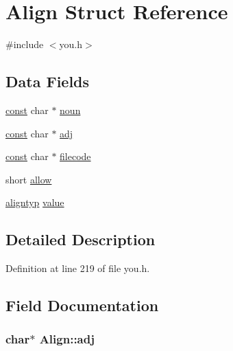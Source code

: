 \hypertarget{structAlign}{\section{Align Struct Reference}
\label{structAlign}
}


{\ttfamily \#include $<$you.\+h$>$}

\subsection*{Data Fields}
\begin{DoxyCompactItemize}
\item 
\hyperlink{tradstdc_8h_a2c212835823e3c54a8ab6d95c652660e}{const} char $\ast$ \hyperlink{structAlign_a94d7781f2c6519d3a4f61e739ce8bedc}{noun}
\item 
\hyperlink{tradstdc_8h_a2c212835823e3c54a8ab6d95c652660e}{const} char $\ast$ \hyperlink{structAlign_acfb054507e2d5b8e2c368deb54df56bd}{adj}
\item 
\hyperlink{tradstdc_8h_a2c212835823e3c54a8ab6d95c652660e}{const} char $\ast$ \hyperlink{structAlign_aea4daca6016229d80d97c0e8fe349cd7}{filecode}
\item 
short \hyperlink{structAlign_a3c94cc9ef4661f20258e562e860d66e9}{allow}
\item 
\hyperlink{align_8h_a3e17b7a656899892e425fc89481aa2ab}{aligntyp} \hyperlink{structAlign_a0fd9044db67c458ef85ff28c84593947}{value}
\end{DoxyCompactItemize}


\subsection{Detailed Description}


Definition at line 219 of file you.\+h.



\subsection{Field Documentation}
\hypertarget{structAlign_acfb054507e2d5b8e2c368deb54df56bd}{
\subsubsection[{adj}]{ char$\ast$ Align\+::adj}}\label{structAlign_acfb054507e2d5b8e2c368deb54df56bd}


